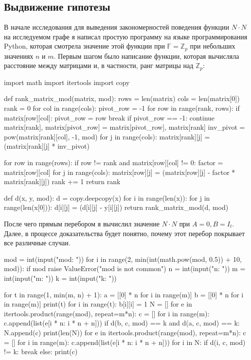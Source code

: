 \documentclass{article}
\begin{document}
\subsection{Выдвижение гипотезы} \label{hypothesizing}
В начале исследования для выведения закономерностей поведения функции $N \cdot N$ на исследуемом графе я написал простую программу на языке программирования Python, которая смотрела значение этой функции при $\mathbb{F} = \mathbb{Z}_p$ при небольших значениях $n$ и $m$. Первым шагом было написание функции, которая вычисляла расстояние между матрицами и, в частности, ранг матрицы над $\mathbb{Z}_p$:
\begin{pythoncode}
import math
import itertools
import copy


def rank_matrix_mod(matrix, mod):
    rows = len(matrix)
    cols = len(matrix[0])
    rank = 0
    for col in range(cols):
        pivot_row = -1
        for row in range(rank, rows):
            if matrix[row][col]:
                pivot_row = row
                break
        if pivot_row == -1:
            continue
        matrix[rank], matrix[pivot_row] = matrix[pivot_row], matrix[rank]
        inv_pivot = pow(matrix[rank][col], -1, mod)
        for j in range(cols):
            matrix[rank][j] = (matrix[rank][j] * inv_pivot) %

        for row in range(rows):
            if row != rank and matrix[row][col] != 0:
                factor = matrix[row][col]
                for j in range(cols):
                    matrix[row][j] = (matrix[row][j] - factor * matrix[rank][j]) %
        rank += 1
    return rank

def d(x, y, mod):
    d = copy.deepcopy(x)
    for i in range(len(x)):
        for j in range(len(x[0])):
            d[i][j] = (d[i][j] - y[i][j]) %
    return rank_matrix_mod(d, mod)
\end{pythoncode}
После чего прямым перебором я вычислил значение $N \cdot N$ при $A = 0, B = I_t$. Далее, в процессе доказательства будет понятно, почему этот перебор покрывает все различные случаи.
\begin{pythoncode}
mod = int(input("mod: "))
for i in range(2, min(int(math.pow(mod, 0.5)) + 10, mod)):
    if mod %
        raise ValueError("mod is not common")
n = int(input("n: "))
m = int(input("m: "))
k = int(input("k: "))


for t in range(1, min(m, n) + 1):
    a = [[0] * n for i in range(m)]
    b = [[0] * n for i in range(m)]
    print(t)
    for i in range(t):
        b[i][i] = 1
    N = []
    for e in itertools.product(range(mod), repeat=m*n):
        c = []
        for i in range(m):
            c.append(list(e[i * n: i * n + n]))
        if d(b, c, mod) == k and d(a, c, mod) == k:
            N.append(c)
    print(len(N))
    for e in itertools.product(range(mod), repeat=m*n):
        c = []
        for i in range(m):
            c.append(list(e[i * n: i * n + n]))
        for i in N:
            if d(i, c, mod) != k:
                break
        else:
            print(c)
\end{pythoncode}
\end{document}
